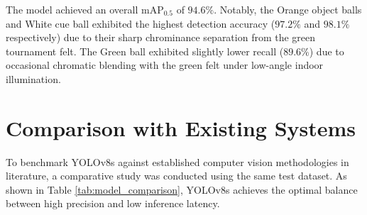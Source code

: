 \begin{table}[H]
\centering
\caption{YOLOv8s Ball Detection Performance Metrics Across Classes}
\label{tab:detection_metrics}
\end{table}

The model achieved an overall $\text{mAP}_{0.5}$ of $94.6\%$. Notably, the Orange object balls and White cue ball exhibited the highest detection accuracy ($97.2\%$ and $98.1\%$ respectively) due to their sharp chrominance separation from the green tournament felt. The Green ball exhibited slightly lower recall ($89.6\%$) due to occasional chromatic blending with the green felt under low-angle indoor illumination.

\section{Comparison with Existing Systems}
To benchmark YOLOv8s against established computer vision methodologies in literature, a comparative study was conducted using the same test dataset. As shown in Table \ref{tab:model_comparison}, YOLOv8s achieves the optimal balance between high precision and low inference latency.


